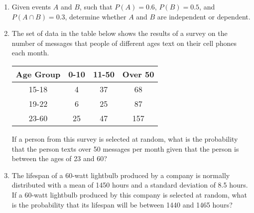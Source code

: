 \documentclass[12pt, twoside]{article}
\begin{document}
\begin{enumerate}[itemsep=0.5cm]
\newpage
\item Given events $A$ and $B$, such that $P(A) = 0.6$, $P(B) = 0.5$, and $P(A \cap B) = 0.3$, determine whether $A$ and $B$ are independent or dependent. \vspace{3cm}

\item The set of data in the table below shows the results of a survey on the number of messages that people of different ages text on their cell phones each month.
\begin{center}
    \begin{tabular}{|c|c|c|c|}
        \hline
        Age Group & 0-10 & 11-50 & Over 50 \\
        \hline
        15-18 & 4 & 37 & 68 \\[0.25cm]
        \hline
        19-22 & 6 & 25 & 87 \\[0.25cm]
        \hline
        23-60 & 25 & 47 & 157 \\[0.25cm]
        \hline
    \end{tabular}
\end{center}
If a person from this survey is selected at random, what is the probability that the person texts over 50 messages per month given that the person is between the ages of 23 and 60?  \vspace{3cm}

\item The lifespan of a 60-watt lightbulb produced by a company is
normally distributed with a mean of 1450 hours and a standard
deviation of 8.5 hours. If a 60-watt lightbulb produced by this
company is selected at random, what is the probability that its lifespan
will be between 1440 and 1465 hours? \vspace{3cm}



\end{enumerate}
\end{document}
